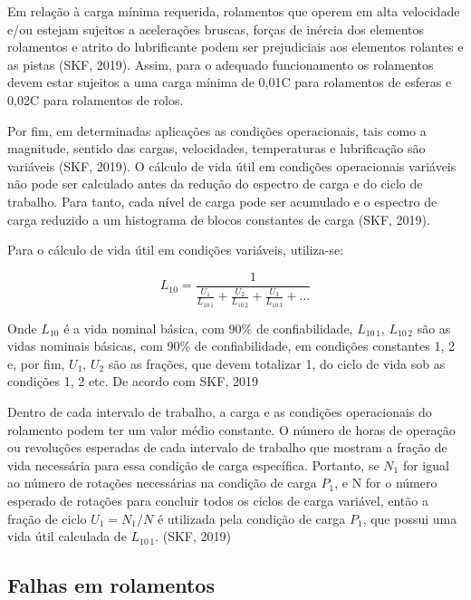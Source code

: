 \documentclass[
	12pt,				
	oneside,			
	a4paper,			
	english,			
	brazil				
	]{abntex2ppgsi}
\begin{document}
Em relação à carga mínima requerida, rolamentos que operem em alta velocidade e/ou estejam sujeitos a acelerações bruscas, forças de inércia dos elementos rolamentos e atrito do lubrificante podem ser prejudiciais aos elementos rolantes e as pistas (SKF, 2019). Assim, para o adequado funcionamento os rolamentos devem estar sujeitos a uma carga mínima de 0,01C para rolamentos de esferas e 0,02C para rolamentos de rolos. 

Por fim, em determinadas aplicações as condições operacionais, tais como a magnitude, sentido das cargas, velocidades, temperaturas e lubrificação são variáveis (SKF, 2019). O cálculo de vida útil em condições operacionais variáveis não pode ser calculado antes da redução do espectro de carga e do ciclo de trabalho. Para tanto, cada nível de carga pode ser acumulado e o espectro de carga reduzido a um histograma de blocos constantes de carga (SKF, 2019).

Para o cálculo de vida útil em condições variáveis, utiliza-se:

\[L_{10}= \frac{1}{ \frac{U_{1}}{L_{10 \,1}} + \frac{U_{2}}{L_{10 \,2}} + \frac{U_{3}}{L_{10 \,3}} + ...}\]

Onde $L_{10}$ é a vida nominal básica, com 90\% de confiabilidade, $L_{10 \,1}$, $L_{10 \,2}$ são as vidas nominais básicas, com 90\% de confiabilidade, em condições constantes 1, 2 e, por fim, $U_{1}$, $U_{2}$ são as frações, que devem totalizar 1, do ciclo de vida sob as condições 1, 2 etc. De acordo com SKF, 2019

\begin{citacao}
Dentro de cada intervalo de trabalho, a carga e as condições operacionais do rolamento podem ter um valor médio constante. O número de horas de operação ou revoluções esperadas de cada intervalo de trabalho que mostram a fração de vida necessária para essa condição de carga específica. Portanto, se ${N_{1}}$ for igual ao número de rotações necessárias na condição de carga ${P_{1}}$, e N for o número esperado de rotações para concluir todos os ciclos de carga variável, então a fração de ciclo ${U_{1} = N_{1} / N}$ é utilizada pela condição de carga ${P_{1}}$, que possui uma vida útil calculada de ${L_{10 \,1}}$. (SKF, 2019)
\end{citacao}


\subsection{\textbf{Falhas em rolamentos}}
\end{document}
